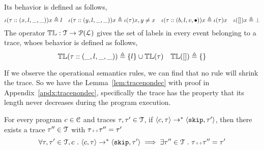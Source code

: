 Its behavior is defined as follows,
  \[
  \iota(\mathtt{\tau}  :: (x, l, \_, \_)) x \triangleq l
  ~~~
  \iota(\mathtt{\tau}  :: (y, l, \_, \_)) x \triangleq \iota(\mathtt{\tau} ) x, y \neq x
  ~~~
  \iota(\mathtt{\tau} :: (b, l, v, \bullet)) x \triangleq \iota(\mathtt{\tau}) x
  ~~~
  \iota({[]}) x \triangleq \bot
  \]
%
  The operator $\mathbb{TL} : \mathcal{T} \to \mathcal{P}{(\mathcal{L})}$ gives the set of labels in every event belonging to 
  a trace, whoes behavior is defined as follows,
\[
\mathbb{TL}{(\mathtt{\tau}  :: (\_, l, \_, \_))} \triangleq \{l\} \cup \mathbb{TL}{(\mathtt{\tau} )}
~~~
\mathbb{TL}({[ ]}) \triangleq \{\}
\]

If we observe the operational semantics rules, we can find that no rule will shrink the trace. 
So we have the Lemma~\ref{lem:tracenondec} with proof in Appendix~\ref{apdx:tracenondec}, 
specifically the trace has the property that its length never decreases during the program execution.
\begin{lem}
\label{lem:tracenondec}
For every program $c \in \mathcal{C}$ and traces $\mathtt{\tau}, \mathtt{\tau}' \in \mathcal{T}$, if 
$\langle c, \mathtt{\tau} \rangle \rightarrow^{*} \langle \mathtt{skip}, \mathtt{\tau}' \rangle$,
then there exists a trace $\mathtt{\tau}'' \in \mathcal{T}$ with $\mathtt{\tau} {\scriptscriptstyle ++} \mathtt{\tau}'' = \mathtt{\tau}'$
%
$$
\forall \mathtt{\tau}, \mathtt{\tau}' \in \mathcal{T}, c ~.~
\langle c, \mathtt{\tau} \rangle \rightarrow^{*} \langle \mathtt{skip}, \mathtt{\tau}' \rangle 
\implies \exists \mathtt{\tau}'' \in \mathcal{T} ~.~ \mathtt{\tau} {\scriptscriptstyle ++} \mathtt{\tau}'' = \mathtt{\tau}'
$$
\end{lem}

